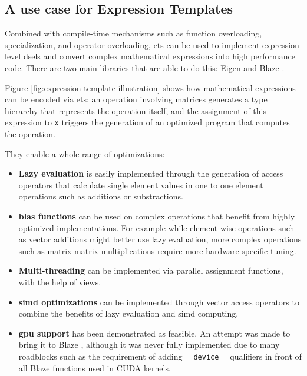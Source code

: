\documentclass[../main]{subfiles}
\begin{document}

\subsection{
  A use case for Expression Templates
}

Combined with compile-time mechanisms such as function overloading,
specialization, and operator overloading, \glspl{et} can be used to
implement expression level \glspl{dsel} and convert complex
mathematical expressions into high performance code\cite{veldhuizen:1995}.
There are two main libraries that are able to do this: Eigen \cite{eigen}
and Blaze \cite{blazelib}.

Figure \ref{fig:expression-template-illustration} shows how mathematical
expressions can be encoded via \glspl{et}: an operation involving matrices
generates a type hierarchy that represents the operation itself,
and the assignment of this expression to \lstinline{x} triggers the generation
of an optimized program that computes the operation.

They enable a whole range of optimizations:

\begin{itemize}

\item
\textbf{Lazy evaluation} is easily implemented through the generation
of access operators that calculate single element values in one to one
element operations such as additions or substractions.

\item
\textbf{\gls{blas} functions} can be used on complex operations that
benefit from highly optimized implementations. For example while
element-wise operations such as vector additions might better use
lazy evaluation, more complex operations such as matrix-matrix multiplications
require more hardware-specific tuning.

\item
\textbf{Multi-threading} can be implemented via parallel assignment functions,
with the help of views.

\item
\textbf{\gls{simd} optimizations} can be implemented through vector access
operators to combine the benefits of lazy evaluation and \gls{simd} computing.

\item
\textbf{\gls{gpu} support} has been demonstrated as feasible.
An attempt was made to bring it to Blaze \cite{blaze_cuda},
although it was never fully implemented due to many roadblocks such as
the requirement of adding \lstinline{__device__} qualifiers in front of
all Blaze functions used in CUDA kernels.

\end{itemize}
\end{document}
